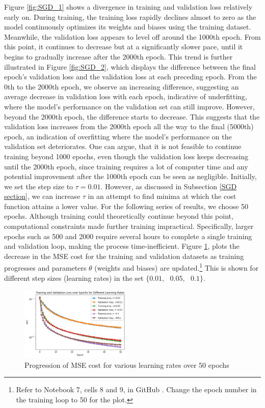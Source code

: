Figure \ref{fig:SGD_1} shows a divergence in training and validation loss relatively early on.  During training, the training loss rapidly declines almost to zero as the model continuously optimizes its weights and biases using the training dataset. Meanwhile, the validation loss appears to level off around the 1000th epoch. From this point, it continues to decrease but at a significantly slower pace, until it begins to gradually increase after the 2000th epoch. This trend is further illustrated in Figure \ref{fig:SGD_2}, which displays the difference between the final epoch's validation loss and the validation loss at each preceding epoch. From the 0th to the 2000th epoch, we observe an increasing difference, suggesting an average decrease in validation loss with each epoch, indicative of underfitting, where the model's performance on the validation set can still improve. However, beyond the 2000th epoch, the difference starts to decrease. This suggests that the validation loss increases from the 2000th epoch all the way to the final (5000th) epoch, an indication of overfitting where the model's performance on the validation set deteriorates. One can argue, that it is not feasible to continue training beyond 1000 epochs, even though the validation loss keeps decreasing until the 2000th epoch, since training requires a lot of computer time and any potential improvement after the 1000th epoch can be seen as negligible. Initially, we set the step size to $\tau = 0.01.$ However, as discussed in Subsection \ref{SGD section}, we can increase $\tau$ in an attempt to find minima at which the cost function attains a lower value. For the following series of results, we choose 50 epochs. Although training could theoretically continue beyond this point, computational constraints made further training impractical. Specifically, larger epochs such as 500 and 2000 require several hours to complete a single training and validation loop, making the process time-inefficient. Figure \ref{fig:SGD_FFNN_LR}, plots the decrease in the MSE cost for the training and validation datasets as training progresses and parameters $\theta$ (weights and biases) are updated.\footnote{Refer to Notebook 7, cells 8 and 9, in GitHub \cite{ThesisCode2023}. Change the epoch number in the training loop to 50 for the plot.} This is shown for different step sizes (learning rates) in the set $\{0.01,\text{ }0.05,\text{ }0.1\}.$
\newpage
\begin{figure}[h!]
    \centering
        \includegraphics[width=0.47\textwidth]{Pictures/SGD_FFNN_loss_lr_log.png}
    \caption{Progression of MSE cost for various learning rates over 50 epochs}\label{fig:SGD_FFNN_LR}
\end{figure}
